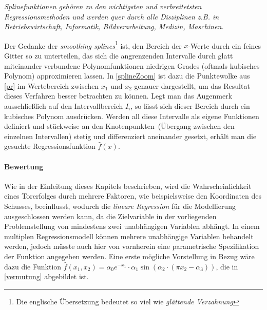 \begin{itemize}

\textit{\glqq Splinefunktionen gehören zu den wichtigsten und verbreitetsten Regressionsmethoden und werden quer durch alle Disziplinen z.B. in Betriebswirtschaft, Informatik, Bildverarbeitung, Medizin, Maschinen.\grqq} 

Der Gedanke der \textit{smoothing splines}\footnote{Die englische Übersetzung bedeutet so viel wie \textit{glättende Verzahnung}} ist, den Bereich der $x$-Werte durch ein feines Gitter so zu unterteilen, das sich die angrenzenden Intervalle durch glatt miteinander verbundene Polynomfunktionen niedrigen Grades (oftmals kubisches Polynom) approximieren lassen. In \vref{splineZoom} ist dazu die Punktewolke aus \vref{pr} im Wertebereich zwischen $x_1$ und $x_2$ genauer dargestellt, um das Resultat dieses Verfahren besser betrachten zu können. Legt man das Augenmerk ausschließlich auf den Intervallbereich $I_i$, so lässt sich dieser Bereich durch ein kubisches Polynom ausdrücken. Werden all diese Intervalle als eigene Funktionen definiert und stückweise an den \glqq Knotenpunkten\grqq~(Übergang zwischen den einzelnen Intervallen) stetig und differenziert aneinander gesetzt, erhält man die gesuchte Regressionsfunktion $\hat{f}(x)$.



\end{itemize}

\paragraph{Bewertung} Wie in der Einleitung dieses Kapitels beschrieben, wird die Wahrscheinlichkeit eines Torerfolges durch mehrere Faktoren, wie beispielsweise den Koordinaten des Schusses, beeinflusst, wodurch die \textit{lineare Regression} für die Modellierung ausgeschlossen werden kann, da die Zielvariable in der vorliegenden Problemstellung von mindestens zwei unabhängigen Variablen abhängt. In einem multiplen Regressionsmodell können mehrere unabhängige Variablen behandelt werden, jedoch müsste auch hier von vornherein eine parametrische Spezifikation der Funktion angegeben werden. Eine erste mögliche Vorstellung in Bezug wäre dazu die Funktion $\hat{f}(x_1,x_2) = \alpha_0 e^{-x_1} \cdot \alpha_1\sin(\alpha_2 \cdot (\pi x_2 - \alpha_3))$, die in \vref{vermutung} abgebildet ist. 



